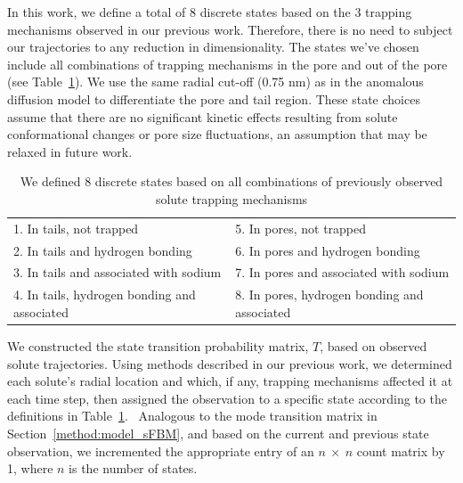 \documentclass{article}
\begin{document}
  In this work, we define a total of 8 discrete states based on the 3 trapping
  mechanisms observed in our previous work. Therefore, there is no need to subject
  our trajectories to any reduction in dimensionality. 
  The states we've 
  chosen include all combinations of trapping mechanisms in the pore and out of
  the pore (see Table~\ref{table:states}). We use the same radial cut-off (0.75 nm)
  as in the anomalous diffusion model to differentiate the pore and tail region. 
  These state choices assume that there are no significant kinetic effects resulting
  from solute conformational changes or pore size fluctuations, an assumption that
  may be relaxed in future work.
  
  \begin{table}[!htb]
	  \centering
	  \begin{tabular}{|l|l|}
	  \hline
	  1. In tails, not trapped                     & 5. In pores, not trapped                     \\
	  2. In tails and hydrogen bonding             & 6. In pores and hydrogen bonding             \\
	  3. In tails and associated with sodium       & 7. In pores and associated with sodium       \\
	  4. In tails, hydrogen bonding and associated & 8. In pores, hydrogen bonding and associated \\
	  \hline
	  \end{tabular}
	  \caption{We defined 8 discrete states based on all combinations of previously observed solute
	  trapping mechanisms}\label{table:states}  
 \end{table}
  
  
  We constructed the state transition probability matrix, $T$, based on observed solute trajectories.
  Using methods described in our previous work, we determined each solute's radial location 
  and which, if any, trapping mechanisms affected it at each time step, then assigned the 
  observation to a specific state according to the definitions in Table~\ref{table:states}.~\cite{coscia_chemically_2019}
  Analogous to the mode transition matrix in Section~\ref{method:model_sFBM}, and based on
  the current and previous state observation, we incremented the appropriate entry of an
  $n~\times~n$ count matrix by 1, where $n$ is the number of states.
  
\end{document}
